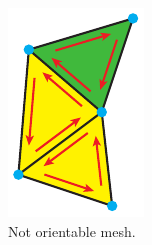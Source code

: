 \begin{description}
\begin{figure}[h]
\begin{subfigure}[b]{0.3\textwidth}
			\includegraphics[width=\textwidth]{images/not_orientable}
			\caption{Not orientable mesh.}
			\label{fig:not_orientable}
		\end{subfigure}
		\begin{subfigure}[b]{0.3\textwidth}

\end{subfigure}
\end{figure}
\end{description}
